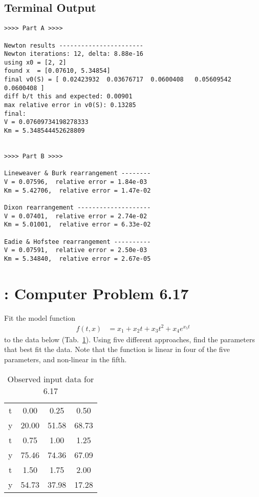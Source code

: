 \documentclass[paper=a4, fontsize=11pt]{scrartcl}
\numberwithin{equation}{section}		%
\numberwithin{figure}{section}			%
\numberwithin{table}{section}				%
\begin{document}
\subsection{Terminal Output}
\begin{verbatim}
>>>> Part A >>>>

Newton results -----------------------
Newton iterations: 12, delta: 8.88e-16
using x0 = [2, 2]
found x  = [0.07610, 5.34854]
final v0(S) = [ 0.02423932  0.03676717  0.0600408   0.05609542  0.0600408 ]
diff b/t this and expected: 0.00901
max relative error in v0(S): 0.13285
final:
V = 0.07609734198278333
Km = 5.348544452628809


>>>> Part B >>>>

Lineweaver & Burk rearrangement --------
V = 0.07596,  relative error = 1.84e-03
Km = 5.42706,  relative error = 1.47e-02

Dixon rearrangement --------------------
V = 0.07401,  relative error = 2.74e-02
Km = 5.01001,  relative error = 6.33e-02

Eadie & Hofstee rearrangement ----------
V = 0.07591,  relative error = 2.50e-03
Km = 5.34840,  relative error = 2.67e-05
\end{verbatim}


\pagebreak
\section{: Computer Problem 6.17}
Fit the model function
\begin{align*}
	f(t,x) &= x_1 + x_2 t + x_3 t^2 + x_4 e^{x_5 t}
\end{align*}
to the data below (Tab.~\ref{tab:6.17input}). Using five different approaches, find the parameters that best fit the data. Note that the function is linear in four of the five parameters, and non-linear in the fifth.
\begin{table}[!hbt]
	\begin{center}
		\caption{Observed input data for 6.17}
		\label{tab:6.17input}
		\begin{tabular}{ c|c c c }
			\hline
			t & 0.00 & 0.25 & 0.50 \\
			y & 20.00 & 51.58 & 68.73 \\
			\hline
			t & 0.75 & 1.00 & 1.25 \\
			y & 75.46 & 74.36 & 67.09 \\
			\hline
			t & 1.50 &1.75 & 2.00 \\
			y & 54.73 & 37.98 & 17.28 \\
			\hline
		\end{tabular}
	\end{center}
\end{table}
\end{document}
